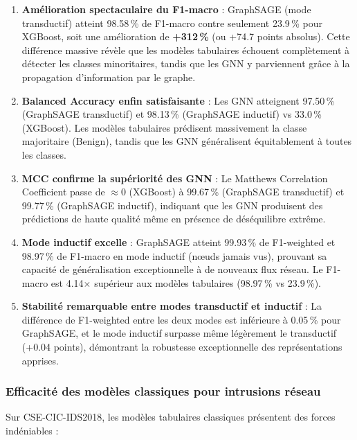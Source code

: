 ﻿\documentclass[11pt,a4paper]{article}
\begin{document}
\begin{enumerate}
    \item \textbf{Amélioration spectaculaire du F1-macro} : GraphSAGE (mode transductif) atteint 98.58\,\% de F1-macro contre seulement 23.9\,\% pour XGBoost, soit une amélioration de \textbf{+312\,\%} (ou +74.7 points absolus). Cette différence massive révèle que les modèles tabulaires échouent complètement à détecter les classes minoritaires, tandis que les GNN y parviennent grâce à la propagation d'information par le graphe.
    
    \item \textbf{Balanced Accuracy enfin satisfaisante} : Les GNN atteignent 97.50\,\% (GraphSAGE transductif) et 98.13\,\% (GraphSAGE inductif) vs 33.0\,\% (XGBoost). Les modèles tabulaires prédisent massivement la classe majoritaire (Benign), tandis que les GNN généralisent équitablement à toutes les classes.
    
    \item \textbf{MCC confirme la supériorité des GNN} : Le Matthews Correlation Coefficient passe de $\approx$0 (XGBoost) à 99.67\,\% (GraphSAGE transductif) et 99.77\,\% (GraphSAGE inductif), indiquant que les GNN produisent des prédictions de haute qualité même en présence de déséquilibre extrême.
    
    \item \textbf{Mode inductif excelle} : GraphSAGE atteint 99.93\,\% de F1-weighted et 98.97\,\% de F1-macro en mode inductif (nœuds jamais vus), prouvant sa capacité de généralisation exceptionnelle à de nouveaux flux réseau. Le F1-macro est 4.14$\times$ supérieur aux modèles tabulaires (98.97\,\% vs 23.9\,\%).
    
    \item \textbf{Stabilité remarquable entre modes transductif et inductif} : La différence de F1-weighted entre les deux modes est inférieure à 0.05\,\% pour GraphSAGE, et le mode inductif surpasse même légèrement le transductif (+0.04 points), démontrant la robustesse exceptionnelle des représentations apprises.
\end{enumerate}

\subsubsection{Efficacité des modèles classiques pour intrusions réseau}

Sur CSE-CIC-IDS2018, les modèles tabulaires classiques présentent des forces indéniables :
\end{document}
